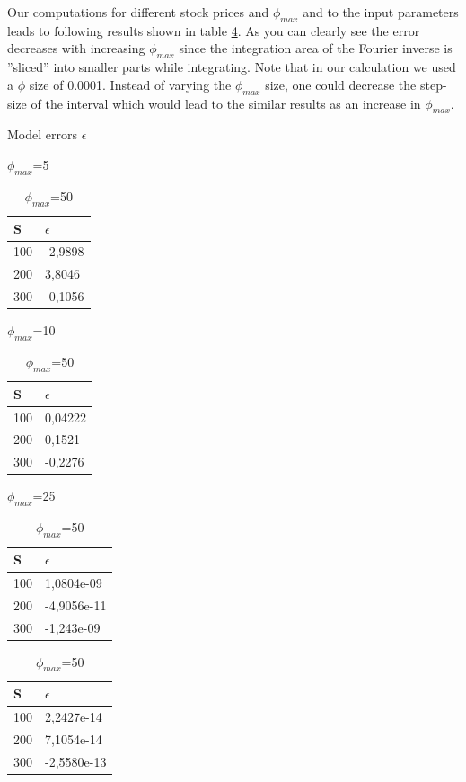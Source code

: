 \documentclass[a4paper,11pt]{article}
\begin{document}
Our computations for different stock prices and $\phi_{max}$ and to the input parameters leads to following results shown in table \ref{result1}. As you can clearly see the error decreases with increasing $\phi_{max}$ since the integration area of the Fourier inverse is ''sliced'' into smaller parts while integrating. Note that in our calculation we used a $\phi$ size of 0.0001. Instead of varying the $\phi_{max}$ size, one could decrease the step-size of the interval which would lead to the  similar results as an increase in $\phi_{max}$. 
\newpage
\begin{table}[!h]
\caption{Model errors $\epsilon$}
\label{result1}
\begin{subtable}{.22\linewidth}
      \centering
        \caption{$\phi_{max}$=5}
\begin{tabular}{l|l}
 \textbf{S} & \textbf{$\epsilon$}  \\\hline
  100 & -2,9898\\
 200  &3,8046  \\
 300 & -0,1056 \\
\end{tabular}
\end{subtable}
\begin{subtable}{.22\linewidth}
      \centering
        \caption{$\phi_{max}$=10}
\begin{tabular}{l|l}
 \textbf{S} & \textbf{$\epsilon$}  \\\hline
  100 &0,04222   \\
 200  &0,1521  \\
 300 &-0,2276  \\
\end{tabular}
\end{subtable}
\begin{subtable}{.22\linewidth}
      \centering
        \caption{$\phi_{max}$=25}
\begin{tabular}{l|l}
 \textbf{S} & \textbf{$\epsilon$}  \\\hline
  100 & 1,0804e-09\\
 200 & -4,9056e-11   \\
 300 &-1,243e-09  \\
\end{tabular}
\end{subtable}
\begin{subtable}{.22\linewidth}
      \centering
        \caption{$\phi_{max}$=50}
\begin{tabular}{l|l}
 \textbf{S} & \textbf{$\epsilon$}  \\\hline
  100 &  2,2427e-14\\
 200  & 7,1054e-14 \\
 300 & -2,5580e-13 \\
\end{tabular}
\end{subtable}
\end{table}
\end{document}
